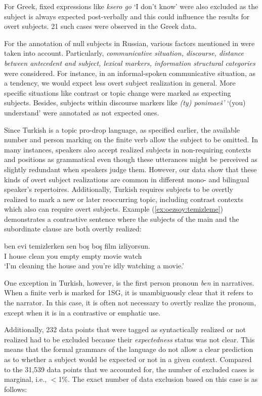 \documentclass[output=paper,colorlinks,citecolor=brown]{langscibook}
\begin{document}
For Greek, fixed expressions like \textit{ksero go} `I don't know' were also excluded as the subject is always expected post-verbally and this could influence the results for overt subjects. 
21 such cases were observed in the Greek data.

For the annotation of null subjects in Russian, various factors mentioned in  were taken into account. 
Particularly, \textit{communicative situation, discourse, distance between antecedent and subject, lexical markers, information structural categories} were considered. 
For instance, in an informal-spoken communicative situation, as a tendency, we would expect less overt subject realization in general. More specific situations like contrast or topic change were marked as expecting subjects.
Besides, subjects within discourse markers like \textit{(ty) ponimaeš'} `(you) understand' were annotated as not expected ones. 

Since Turkish is a topic pro-drop language, as specified earlier, the available number and person marking on the finite verb allow the subject to be omitted. In many instances, speakers also accept realized subjects in non-requiring contexts and positions as grammatical even though these utterances might be perceived as slightly redundant when speakers judge them. However, our data show that these kinds of overt subject realizations are common in different mono- and bilingual speaker's repertoires.
Additionally, Turkish requires subjects to be overtly realized to mark a new or later reoccurring topic, including contrast contexts which also can require overt subjects. Example (\ref{ex:oezsoy:temizleme}) demonstrates a contrastive sentence where the subjects of the main and the subordinate clause are both overtly realized:

\ea \label{ex:oezsoy:temizleme}
\gll ben evi temizlerken sen boş boş film izliyorsun.\\ 
	I house clean you empty empty movie watch\\
\glt `I'm cleaning the house and you're idly watching a movie.'
\z
{}

One exception in Turkish, however, is the first person pronoun \textit{ben} in narratives. 
When a finite verb is marked for 1SG, it is unambiguously clear that it refers to the narrator. 
In this case, it is often not necessary to overtly realize the pronoun, except when it is in a contrastive or emphatic use.

Additionally, 232 data points that were tagged as syntactically realized or not realized had to be excluded because their \textit{expectedness} status was not clear. 
This means that the formal grammars of the language do not allow a clear prediction as to whether a subject would be expected or not in a given context. 
Compared to the 31,539 data points that we accounted for, the number of excluded cases is marginal, i.e., $<$1\%. The exact number of data exclusion based on this case is as follows: 
\end{document}
